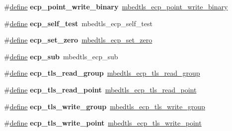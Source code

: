 \begin{DoxyCompactItemize}
\#\hyperlink{structdefine}{define} {\bfseries ecp\+\_\+point\+\_\+write\+\_\+binary}~\hyperlink{ecp_8h_af7d35a6631f662cc279eed8c4f0f7ba6}{mbedtls\+\_\+ecp\+\_\+point\+\_\+write\+\_\+binary}
\item 
\mbox{\label{compat-1_83_8h_a515115f10d0004381ea60ccd66bf505a}} 
\#\hyperlink{structdefine}{define} {\bfseries ecp\+\_\+self\+\_\+test}~mbedtls\+\_\+ecp\+\_\+self\+\_\+test
\item 
\mbox{\label{compat-1_83_8h_ad9bdec2d294d471a9b235b06be63fa2a}} 
\#\hyperlink{structdefine}{define} {\bfseries ecp\+\_\+set\+\_\+zero}~\hyperlink{ecp_8h_ac18b1dfe4223ac6dc6c637b2edc4a481}{mbedtls\+\_\+ecp\+\_\+set\+\_\+zero}
\item 
\mbox{\label{compat-1_83_8h_aa03f07c4496f54a99c0d171d004c1651}} 
\#\hyperlink{structdefine}{define} {\bfseries ecp\+\_\+sub}~mbedtls\+\_\+ecp\+\_\+sub
\item 
\mbox{\label{compat-1_83_8h_a9ef691874d0edc09871af3828effc6f3}} 
\#\hyperlink{structdefine}{define} {\bfseries ecp\+\_\+tls\+\_\+read\+\_\+group}~\hyperlink{ecp_8h_acfd0cdb926358713b31c48b2e4dd9e58}{mbedtls\+\_\+ecp\+\_\+tls\+\_\+read\+\_\+group}
\item 
\mbox{\label{compat-1_83_8h_ad361a6b042cfa61252e209096d7f0da2}} 
\#\hyperlink{structdefine}{define} {\bfseries ecp\+\_\+tls\+\_\+read\+\_\+point}~\hyperlink{ecp_8h_a883eb26a1be64c491ea0354189ae2604}{mbedtls\+\_\+ecp\+\_\+tls\+\_\+read\+\_\+point}
\item 
\mbox{\label{compat-1_83_8h_ab02c3a2ece1f2c9d5eba2acefb388866}} 
\#\hyperlink{structdefine}{define} {\bfseries ecp\+\_\+tls\+\_\+write\+\_\+group}~\hyperlink{ecp_8h_a2ae23f66900fe6f3ef50eb30af4143d0}{mbedtls\+\_\+ecp\+\_\+tls\+\_\+write\+\_\+group}
\item 
\mbox{\label{compat-1_83_8h_ad26b20f5dbb94d9ced157a6fad77ef6e}} 
\#\hyperlink{structdefine}{define} {\bfseries ecp\+\_\+tls\+\_\+write\+\_\+point}~\hyperlink{ecp_8h_aa98adfe68b926724607d8fcab61397a9}{mbedtls\+\_\+ecp\+\_\+tls\+\_\+write\+\_\+point}
\item 
\mbox{\label{compat-1_83_8h_a07bc8def1310a4349c62aa8074fc2be7}} 

\end{DoxyCompactItemize}
